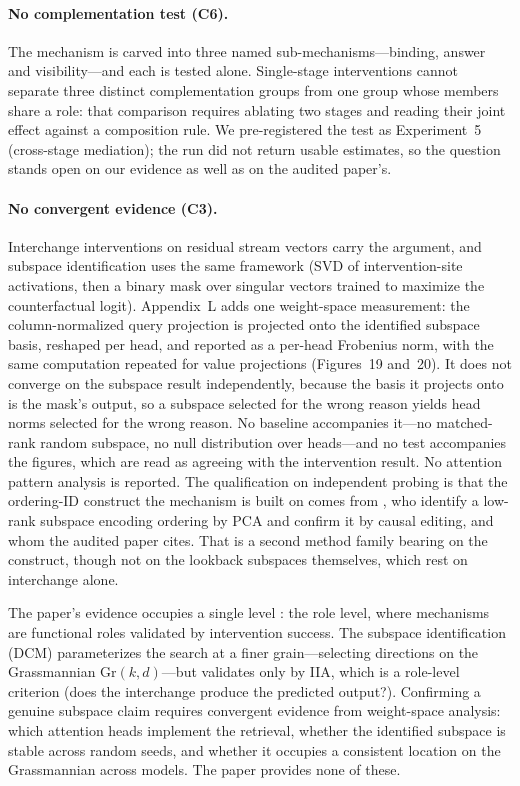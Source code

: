 \documentclass{article}
\begin{document}
\paragraph{No complementation test (C6).}
The mechanism is carved into three named sub-mechanisms---binding, answer and
visibility---and each is tested alone. Single-stage interventions cannot separate three
distinct complementation groups from one group whose members share a role: that comparison
requires ablating two stages and reading their joint effect against a composition rule. We
pre-registered the test as Experiment~5 (cross-stage mediation); the run did not return
usable estimates, so the question stands open on our evidence as well as on the audited
paper's.

\paragraph{No convergent evidence (C3).}
Interchange interventions on residual stream vectors carry the argument, and subspace identification uses the same framework (SVD of intervention-site activations, then a binary mask over singular vectors trained to maximize the counterfactual logit). Appendix~L adds one weight-space measurement: the column-normalized query projection is projected onto the identified subspace basis, reshaped per head, and reported as a per-head Frobenius norm, with the same computation repeated for value projections (Figures~19 and~20). It does not converge on the subspace result independently, because the basis it projects onto is the mask's output, so a subspace selected for the wrong reason yields head norms selected for the wrong reason. No baseline accompanies it---no matched-rank random subspace, no null distribution over heads---and no test accompanies the figures, which are read as agreeing with the intervention result. No attention pattern analysis is reported. The qualification on independent
probing is that the ordering-ID construct the mechanism is built on comes from
\citet{dai2024representational}, who identify a low-rank subspace encoding ordering by PCA
and confirm it by causal editing, and whom the audited paper cites. That is a second method
family bearing on the construct, though not on the lookback subspaces themselves, which rest
on interchange alone.

The paper's evidence occupies a single level \citep{tower2026mechviews}: the role level, where mechanisms are functional roles validated by intervention success. The subspace identification (DCM) parameterizes the search at a finer grain---selecting directions on the Grassmannian $\text{Gr}(k, d)$---but validates only by IIA, which is a role-level criterion (does the interchange produce the predicted output?). Confirming a genuine subspace claim requires convergent evidence from weight-space analysis: which attention heads implement the retrieval, whether the identified subspace is stable across random seeds, and whether it occupies a consistent location on the Grassmannian across models. The paper provides none of these.
\end{document}

